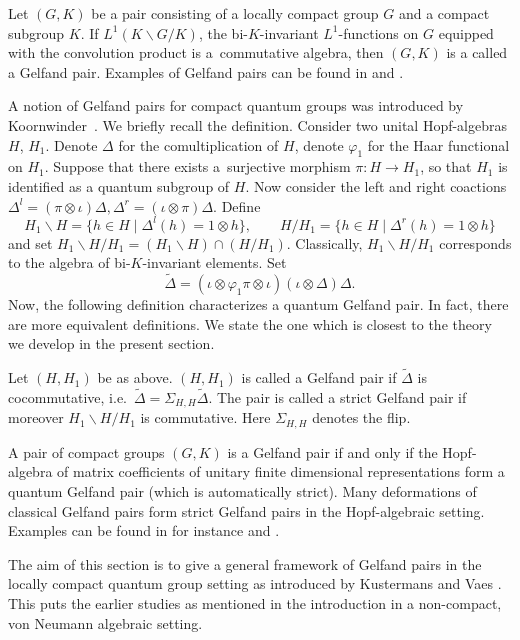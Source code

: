 Let $(G, K)$ be a pair consisting of a locally compact group $G$ and a compact subgroup $K$. If $L^1(K \backslash G \slash K)$, the bi-$K$-invariant $L^1$-functions on $G$ equipped with the convolution product is a~commutative algebra, then $(G,K)$ is a called a Gelfand pair. Examples of Gelfand pairs can be found in \cite[Chapter~7]{Dij} and \cite{Far}.

A notion of Gelfand pairs for compact quantum groups was introduced by Koornwinder~\cite{Koo}. We brief\/ly recall the def\/inition. Consider two unital Hopf-algebras $H$, $H_1$. Denote $\Delta$ for the comultiplication of $H$, denote $\varphi_1$ for the Haar functional on $H_1$. Suppose that there exists a~surjective morphism $\pi: H \rightarrow H_1$, so that $H_1$ is identif\/ied as a quantum subgroup of $H$. Now consider the left and right coactions
$
\Delta^l = (\pi \otimes \iota) \Delta,  \Delta^r = (\iota \otimes \pi) \Delta.
$
 Def\/ine
\[
H_1 \backslash H   = \big\{ h \in H \mid \Delta^l(h) = 1 \otimes h\big\}, \qquad  H \slash H_1   = \big\{ h \in H \mid \Delta^r(h) = 1 \otimes h\big\}
\]
 and set $H_1 \backslash H  \slash H_1 = (H_1 \backslash H)  \cap (H  \slash H_1)$. Classically, $H_1 \backslash H  \slash H_1$ corresponds to the algebra of bi-$K$-invariant elements. Set
\[
\tilde{\Delta}  = (\iota \otimes \varphi_1 \pi \otimes \iota)(\iota \otimes \Delta) \Delta.
\]
Now, the following def\/inition characterizes a quantum Gelfand pair. In fact, there are more equivalent def\/initions. We state the one which is closest to the theory we develop in the present section.
\begin{dfn}
Let $(H, H_1)$ be as above. $(H, H_1)$ is called a Gelfand pair if $\tilde{\Delta}$ is cocommutative, i.e.\ $\tilde{\Delta} = \Sigma_{H, H} \tilde{\Delta}$. The pair is called a strict Gelfand pair if moreover $H_1 \backslash H  \slash H_1$ is commutative. Here $\Sigma_{H, H}$ denotes the f\/lip.
\end{dfn}

A pair of compact groups $(G, K)$ is a Gelfand pair if and only if the Hopf-algebra of matrix coef\/f\/icients of unitary f\/inite dimensional representations form a quantum Gelfand pair (which is automatically strict).  Many deformations of classical Gelfand pairs form   strict Gelfand pairs in the Hopf-algebraic setting. Examples  can be found in for instance \cite{Flo, KoeAsk, NouYamMim, VaiGel} and \cite{VaiHyp}.

The aim of this section is to give a general framework of Gelfand pairs in the locally compact quantum group setting as introduced by Kustermans and Vaes \cite{KusVae, KusVaeII}. This puts the earlier studies as mentioned in the introduction in a non-compact, von Neumann algebraic setting.

